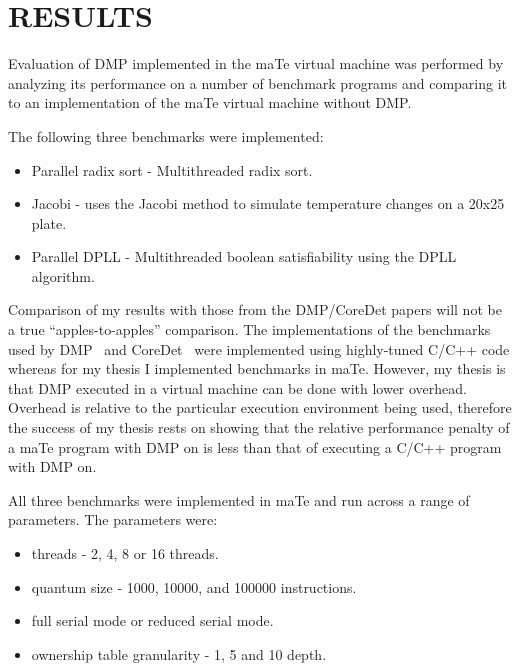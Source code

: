 \chapter{RESULTS}
\label{RESULTS}

Evaluation of DMP implemented in the maTe virtual machine was
performed by analyzing its performance on a number of benchmark
programs and comparing it to an implementation of the maTe virtual
machine without DMP.

The following three benchmarks were implemented:

\begin{itemize}
\item Parallel radix sort - Multithreaded radix sort.

\item Jacobi - uses the Jacobi method to simulate temperature changes
  on a 20x25 plate.

\item Parallel DPLL - Multithreaded boolean satisfiability using the
  DPLL algorithm.
\end{itemize}

Comparison of my results with those from the DMP/CoreDet papers will
not be a true ``apples-to-apples'' comparison.  The implementations of
the benchmarks used by DMP~\cite{dmp} and CoreDet~\cite{coredet} were
implemented using highly-tuned C/C++ code whereas for my thesis I
implemented benchmarks in maTe.  However, my thesis is that DMP
executed in a virtual machine can be done with lower overhead.
Overhead is relative to the particular execution environment being
used, therefore the success of my thesis rests on showing that the
relative performance penalty of a maTe program with DMP on is less
than that of executing a C/C++ program with DMP on.

All three benchmarks were implemented in maTe and run across a range
of parameters.  The parameters were:

\begin{itemize}
\item threads - 2, 4, 8 or 16 threads.

\item quantum size - 1000, 10000, and 100000 instructions.

\item full serial mode or reduced serial mode.

\item ownership table granularity - 1, 5 and 10 depth.
\end{itemize}

